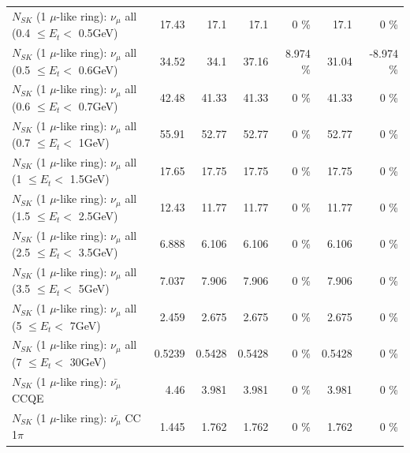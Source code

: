 \begin{table}
\begin{tabular}{| l | r | r | r  r | r  r |}
       $N_{SK}$ (1 $\mu$-like ring): $\nu_{\mu}$ all (0.4 $\leq E_{t} <$ 0.5GeV) &           17.43 &            17.1 &            17.1 &        0 \%  &            17.1 &        0 \%  \\ 
       $N_{SK}$ (1 $\mu$-like ring): $\nu_{\mu}$ all (0.5 $\leq E_{t} <$ 0.6GeV) &           34.52 &            34.1 &           37.16 &    8.974 \%  &           31.04 &   -8.974 \%  \\ 
       $N_{SK}$ (1 $\mu$-like ring): $\nu_{\mu}$ all (0.6 $\leq E_{t} <$ 0.7GeV) &           42.48 &           41.33 &           41.33 &        0 \%  &           41.33 &        0 \%  \\ 
         $N_{SK}$ (1 $\mu$-like ring): $\nu_{\mu}$ all (0.7 $\leq E_{t} <$ 1GeV) &           55.91 &           52.77 &           52.77 &        0 \%  &           52.77 &        0 \%  \\ 
         $N_{SK}$ (1 $\mu$-like ring): $\nu_{\mu}$ all (1 $\leq E_{t} <$ 1.5GeV) &           17.65 &           17.75 &           17.75 &        0 \%  &           17.75 &        0 \%  \\ 
       $N_{SK}$ (1 $\mu$-like ring): $\nu_{\mu}$ all (1.5 $\leq E_{t} <$ 2.5GeV) &           12.43 &           11.77 &           11.77 &        0 \%  &           11.77 &        0 \%  \\ 
       $N_{SK}$ (1 $\mu$-like ring): $\nu_{\mu}$ all (2.5 $\leq E_{t} <$ 3.5GeV) &           6.888 &           6.106 &           6.106 &        0 \%  &           6.106 &        0 \%  \\ 
         $N_{SK}$ (1 $\mu$-like ring): $\nu_{\mu}$ all (3.5 $\leq E_{t} <$ 5GeV) &           7.037 &           7.906 &           7.906 &        0 \%  &           7.906 &        0 \%  \\ 
           $N_{SK}$ (1 $\mu$-like ring): $\nu_{\mu}$ all (5 $\leq E_{t} <$ 7GeV) &           2.459 &           2.675 &           2.675 &        0 \%  &           2.675 &        0 \%  \\ 
          $N_{SK}$ (1 $\mu$-like ring): $\nu_{\mu}$ all (7 $\leq E_{t} <$ 30GeV) &          0.5239 &          0.5428 &          0.5428 &        0 \%  &          0.5428 &        0 \%  \\ 
\hline
\hline
\hline
                              $N_{SK}$ (1 $\mu$-like ring): $\bar{\nu_\mu}$ CCQE &            4.46 &           3.981 &           3.981 &        0 \%  &           3.981 &        0 \%  \\ 
                         $N_{SK}$ (1 $\mu$-like ring): $\bar{\nu_\mu}$ CC 1$\pi$ &           1.445 &           1.762 &           1.762 &        0 \%  &           1.762 &        0 \%  \\ 

\end{tabular}
\end{table}
